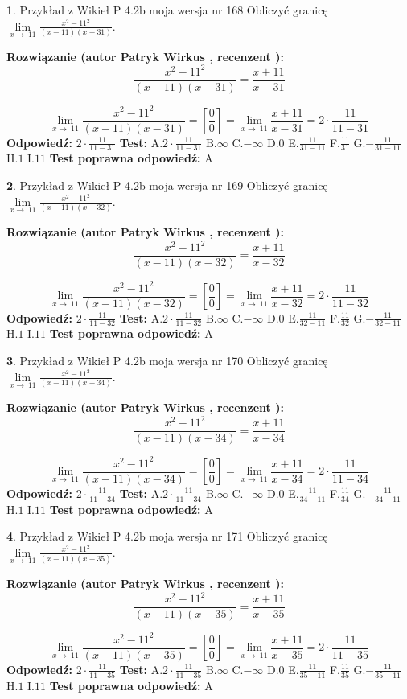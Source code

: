\documentclass[12pt, a4paper]{article}
\theoremstyle{definition} %
\newtheorem{zad}{}
\newcommand{\zadStart}[1]{\begin{zad}#1\newline}
\newcommand{\zadStop}{\end{zad}}
\newcommand{\rozwStart}[2]{\noindent \textbf{Rozwiązanie (autor #1 , recenzent #2): }\newline}
\newcommand{\rozwStop}{\newline}
\newcommand{\odpStart}{\noindent \textbf{Odpowiedź:}\newline}
\newcommand{\odpStop}{\newline}
\newcommand{\testStart}{\noindent \textbf{Test:}\newline}
\newcommand{\testStop}{\newline}
\newcommand{\kluczStart}{\noindent \textbf{Test poprawna odpowiedź:}\newline}
\newcommand{\kluczStop}{\newline}
\begin{document}
\zadStart{Przykład z Wikieł P 4.2b moja wersja nr 168}
Obliczyć granicę $\lim\limits_{x\to\ 11}\frac{x^{2}-11^{2}}{(x-11)(x-31)}$.
\zadStop
\rozwStart{Patryk Wirkus}{}
$$\frac{x^{2}-11^{2}}{(x-11)(x-31)}=\frac{x+11}{x-31}$$

$$\lim\limits_{x\to\ 11}\frac{x^{2}-11^{2}}{(x-11)(x-31)}=[\frac{0}{0}]=\lim\limits_{x\to\ 11}\frac{x+11}{x-31}=2 \cdot \frac{11}{11-31}$$
\rozwStop
\odpStart
$2 \cdot \frac{11}{11-31}$
\odpStop
\testStart
A.$2 \cdot \frac{11}{11-31}$
B.$\infty$
C.$-\infty$
D.$0$
E.$\frac{11}{31-11}$
F.$\frac{11}{31}$
G.$-\frac{11}{31-11}$
H.$1$
I.$11$
\testStop
\kluczStart
A
\kluczStop



\zadStart{Przykład z Wikieł P 4.2b moja wersja nr 169}
Obliczyć granicę $\lim\limits_{x\to\ 11}\frac{x^{2}-11^{2}}{(x-11)(x-32)}$.
\zadStop
\rozwStart{Patryk Wirkus}{}
$$\frac{x^{2}-11^{2}}{(x-11)(x-32)}=\frac{x+11}{x-32}$$

$$\lim\limits_{x\to\ 11}\frac{x^{2}-11^{2}}{(x-11)(x-32)}=[\frac{0}{0}]=\lim\limits_{x\to\ 11}\frac{x+11}{x-32}=2 \cdot \frac{11}{11-32}$$
\rozwStop
\odpStart
$2 \cdot \frac{11}{11-32}$
\odpStop
\testStart
A.$2 \cdot \frac{11}{11-32}$
B.$\infty$
C.$-\infty$
D.$0$
E.$\frac{11}{32-11}$
F.$\frac{11}{32}$
G.$-\frac{11}{32-11}$
H.$1$
I.$11$
\testStop
\kluczStart
A
\kluczStop



\zadStart{Przykład z Wikieł P 4.2b moja wersja nr 170}
Obliczyć granicę $\lim\limits_{x\to\ 11}\frac{x^{2}-11^{2}}{(x-11)(x-34)}$.
\zadStop
\rozwStart{Patryk Wirkus}{}
$$\frac{x^{2}-11^{2}}{(x-11)(x-34)}=\frac{x+11}{x-34}$$

$$\lim\limits_{x\to\ 11}\frac{x^{2}-11^{2}}{(x-11)(x-34)}=[\frac{0}{0}]=\lim\limits_{x\to\ 11}\frac{x+11}{x-34}=2 \cdot \frac{11}{11-34}$$
\rozwStop
\odpStart
$2 \cdot \frac{11}{11-34}$
\odpStop
\testStart
A.$2 \cdot \frac{11}{11-34}$
B.$\infty$
C.$-\infty$
D.$0$
E.$\frac{11}{34-11}$
F.$\frac{11}{34}$
G.$-\frac{11}{34-11}$
H.$1$
I.$11$
\testStop
\kluczStart
A
\kluczStop



\zadStart{Przykład z Wikieł P 4.2b moja wersja nr 171}
Obliczyć granicę $\lim\limits_{x\to\ 11}\frac{x^{2}-11^{2}}{(x-11)(x-35)}$.
\zadStop
\rozwStart{Patryk Wirkus}{}
$$\frac{x^{2}-11^{2}}{(x-11)(x-35)}=\frac{x+11}{x-35}$$

$$\lim\limits_{x\to\ 11}\frac{x^{2}-11^{2}}{(x-11)(x-35)}=[\frac{0}{0}]=\lim\limits_{x\to\ 11}\frac{x+11}{x-35}=2 \cdot \frac{11}{11-35}$$
\rozwStop
\odpStart
$2 \cdot \frac{11}{11-35}$
\odpStop
\testStart
A.$2 \cdot \frac{11}{11-35}$
B.$\infty$
C.$-\infty$
D.$0$
E.$\frac{11}{35-11}$
F.$\frac{11}{35}$
G.$-\frac{11}{35-11}$
H.$1$
I.$11$
\testStop
\kluczStart
A
\kluczStop
\end{document}
